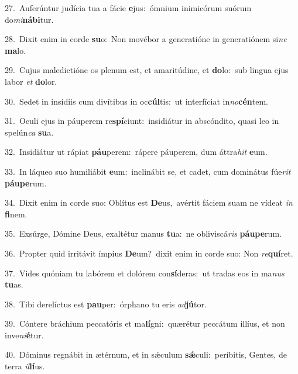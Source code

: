 {\numbfont\textcolor{\numbcolor}{27.}}~Auferúntur judícia tua a fácie \textbf{e}\-jus:~\star ómnium inimicórum suórum do\-\textit{mi}\-\textbf{ná}\textbf{bi}tur.\par
{\numbfont\textcolor{\numbcolor}{28.}}~Dixit enim in corde \textbf{su}\-o:~\star Non movébor a generatióne in generatiónem si\textit{ne} \textbf{ma}\-lo.\par
{\numbfont\textcolor{\numbcolor}{29.}}~Cujus maledictióne os plenum est, et amaritúdine, et \textbf{do}\-lo:~\star sub lingua ejus labor \textit{et} \textbf{do}\-lor.\par
{\numbfont\textcolor{\numbcolor}{30.}}~Sedet in insídiis cum divítibus in oc\-\textbf{cúl}\-tis:~\star ut interfíciat in\-\textit{no}\-\textbf{cén}tem.\par
{\numbfont\textcolor{\numbcolor}{31.}}~Oculi ejus in páuperem re\-\textbf{spí}\-ciunt:~\star insidiátur in abscóndito, quasi leo in spelún\textit{ca} \textbf{su}\-a.\par
{\numbfont\textcolor{\numbcolor}{32.}}~Insidiátur ut rápiat \textbf{páu}\-perem:~\star rápere páuperem, dum áttra\textit{hit} \textbf{e}\-um.\par
{\numbfont\textcolor{\numbcolor}{33.}}~In láqueo suo humiliábit \textbf{e}\-um:~\star inclinábit se, et cadet, cum dominátus fúe\textit{rit} \textbf{páu}\-\textbf{pe}rum.\par
{\numbfont\textcolor{\numbcolor}{34.}}~Dixit enim in corde suo: Oblítus est \textbf{De}\-us,~\star avértit fáciem suam ne vídeat \textit{in} \textbf{fi}\-nem.\par
{\numbfont\textcolor{\numbcolor}{35.}}~Exsúrge, Dómine Deus, exaltétur manus \textbf{tu}\-a:~\star ne obliviscá\textit{ris} \textbf{páu}\-\textbf{pe}rum.\par
{\numbfont\textcolor{\numbcolor}{36.}}~Propter quid irritávit ímpius \textbf{De}\-um?~\star dixit enim in corde suo: Non \textit{re}\-\textbf{quí}ret.\par
{\numbfont\textcolor{\numbcolor}{37.}}~Vides quóniam tu labórem et dolórem con\-\textbf{sí}\-deras:~\star ut tradas eos in ma\textit{nus} \textbf{tu}\-as.\par
{\numbfont\textcolor{\numbcolor}{38.}}~Tibi derelíctus est \textbf{pau}\-per:~\star órphano tu eris \textit{ad}\-\textbf{jú}tor.\par
{\numbfont\textcolor{\numbcolor}{39.}}~Cóntere bráchium peccatóris et ma\-\textbf{lí}\-gni:~\star quærétur peccátum illíus, et non inve\-\textit{ni}\-\textbf{é}tur.\par
{\numbfont\textcolor{\numbcolor}{40.}}~Dóminus regnábit in ætérnum, et in sǽculum \textbf{sǽ}\-culi:~\star períbitis, Gentes, de terra \textit{il}\-\textbf{lí}us.\par
